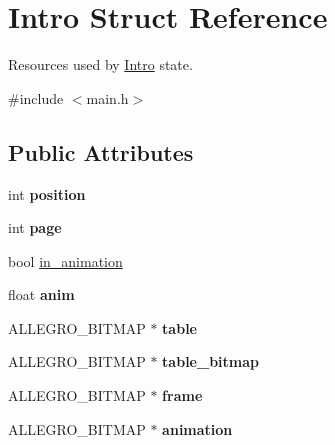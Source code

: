 \hypertarget{structIntro}{\section{\-Intro \-Struct \-Reference}
\label{structIntro}
}


\-Resources used by \hyperlink{structIntro}{\-Intro} state.  




{\ttfamily \#include $<$main.\-h$>$}

\subsection*{\-Public \-Attributes}
\begin{DoxyCompactItemize}
\item 
\hypertarget{structIntro_a5c266b2590d4304f92fd3bad033f4375}{int {\bfseries position}}\label{structIntro_a5c266b2590d4304f92fd3bad033f4375}

\item 
\hypertarget{structIntro_aaea1b2d24c0c9a5437c59d727c79ebd1}{int {\bfseries page}}\label{structIntro_aaea1b2d24c0c9a5437c59d727c79ebd1}

\item 
bool \hyperlink{structIntro_a2876fd8a7bfd940c3936eb6445984a22}{in\-\_\-animation}
\item 
\hypertarget{structIntro_a7bac02ef374847f0efbe638892cb401f}{float {\bfseries anim}}\label{structIntro_a7bac02ef374847f0efbe638892cb401f}

\item 
\hypertarget{structIntro_a342227f3940dba9ed6b5d3bb4579fd48}{\-A\-L\-L\-E\-G\-R\-O\-\_\-\-B\-I\-T\-M\-A\-P $\ast$ {\bfseries table}}\label{structIntro_a342227f3940dba9ed6b5d3bb4579fd48}

\item 
\hypertarget{structIntro_a77ea358d1f44d69e5477f5dedfc9fd2b}{\-A\-L\-L\-E\-G\-R\-O\-\_\-\-B\-I\-T\-M\-A\-P $\ast$ {\bfseries table\-\_\-bitmap}}\label{structIntro_a77ea358d1f44d69e5477f5dedfc9fd2b}

\item 
\hypertarget{structIntro_a122ded263b7d3b22ee9a11555d84df52}{\-A\-L\-L\-E\-G\-R\-O\-\_\-\-B\-I\-T\-M\-A\-P $\ast$ {\bfseries frame}}\label{structIntro_a122ded263b7d3b22ee9a11555d84df52}

\item 
\hypertarget{structIntro_a313aec692ca43eb77fb81986d377c073}{\-A\-L\-L\-E\-G\-R\-O\-\_\-\-B\-I\-T\-M\-A\-P $\ast$ {\bfseries animation}}\label{structIntro_a313aec692ca43eb77fb81986d377c073}


\end{DoxyCompactItemize}
